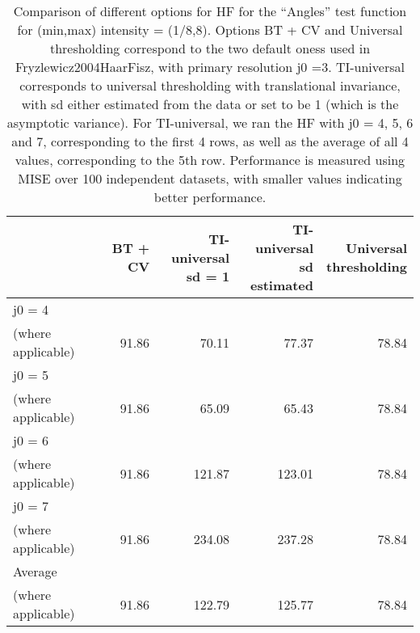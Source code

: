 \documentclass[12pt]{article}
\begin{document}
\begin{table}[ht]
\centering
\begin{tabular}{lrrrr}
  \hline
 & BT + CV & \pbox{20cm}{TI-universal \\ sd = 1} & \pbox{20cm}{TI-universal \\ sd estimated} & \pbox{20cm}{Universal \\ thresholding} \\ 
  \hline
j0 = 4 \\
 (where applicable) & 91.86 & 70.11 & 77.37 & 78.84 \\ 
  j0 = 5 \\
 (where applicable) & 91.86 & 65.09 & 65.43 & 78.84 \\ 
  j0 = 6 \\
 (where applicable) & 91.86 & 121.87 & 123.01 & 78.84 \\ 
  j0 = 7 \\
 (where applicable) & 91.86 & 234.08 & 237.28 & 78.84 \\ 
  Average \\
 (where applicable) & 91.86 & 122.79 & 125.77 & 78.84 \\ 
   \hline
\end{tabular}
\caption{Comparison of different options for HF for the ``Angles'' test function for (min,max) intensity = (1/8,8). Options BT + CV and Universal thresholding correspond to the two default oness used in {Fryzlewicz2004HaarFisz}, with primary resolution j0 =3. TI-universal corresponds to universal thresholding with translational invariance, with sd either estimated from the data or set to be 1 (which is the asymptotic variance). For TI-universal, we ran the HF with j0 = 4, 5, 6 and 7, corresponding to the first 4 rows, as well as the average of all 4 values, corresponding to the 5th row. Performance is measured using MISE over 100 independent datasets, with smaller values indicating better performance.} 
\label{table:pois_hf_ang_8}
\end{table}
\end{document}
